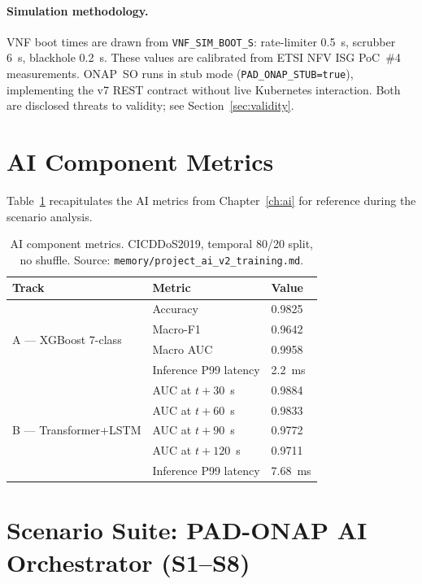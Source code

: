 \paragraph{Simulation methodology.}
VNF boot times are drawn from \texttt{VNF\_SIM\_BOOT\_S}: rate-limiter
0.5~s, scrubber 6~s, blackhole 0.2~s. These values are calibrated from
ETSI NFV ISG PoC~\#4 measurements. ONAP~SO runs in stub mode
(\texttt{PAD\_ONAP\_STUB=true}), implementing the v7 REST contract without
live Kubernetes interaction. Both are disclosed threats to validity;
see Section~\ref{sec:validity}.

\section{AI Component Metrics}
\label{sec:ai-metrics-eval}

Table~\ref{tab:ai-metrics} recapitulates the AI metrics from Chapter~\ref{ch:ai}
for reference during the scenario analysis.

\begin{table}[H]
\centering
\small
\caption{AI component metrics. CICDDoS2019, temporal 80/20 split,
no shuffle. Source: \texttt{memory/project\_ai\_v2\_training.md}.}
\label{tab:ai-metrics}
\begin{tabular}{@{}lll@{}}
\toprule
Track & Metric & Value \\
\midrule
\multirow{4}{*}{A --- XGBoost 7-class}
  & Accuracy              & 0.9825 \\
  & Macro-F1              & 0.9642 \\
  & Macro AUC             & 0.9958 \\
  & Inference P99 latency & 2.2~ms \\
\midrule
\multirow{5}{*}{B --- Transformer+LSTM}
  & AUC at $t{+}30$~s    & 0.9884 \\
  & AUC at $t{+}60$~s    & 0.9833 \\
  & AUC at $t{+}90$~s    & 0.9772 \\
  & AUC at $t{+}120$~s   & 0.9711 \\
  & Inference P99 latency & 7.68~ms \\
\bottomrule
\end{tabular}
\end{table}

\section{Scenario Suite: PAD-ONAP AI Orchestrator (S1--S8)}
\label{sec:s1-s8}

